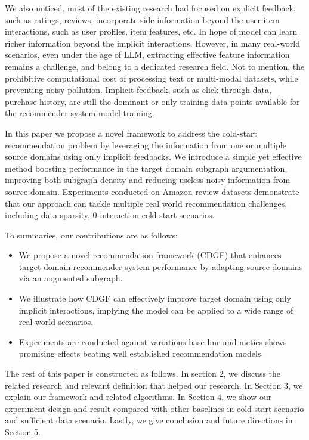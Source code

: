 We also noticed, most of the existing research had focused on explicit feedback, such as ratings, reviews, incorporate side information beyond the user-item interactions, such as user profiles, item features, etc. In hope of model can learn richer information beyond the implicit interactions.
However, in many real-world scenarios, even under the age of LLM, extracting effective feature information remains a challenge, and belong to a dedicated research field. Not to mention, the prohibitive computational cost of processing text or multi-modal datasets, while preventing noisy pollution. Implicit feedback, such as click-through data, purchase history, are still the dominant or only training data points available for the recommender system model training.

In this paper we propose a novel framework to address the cold-start recommendation problem by leveraging the information from one or multiple source domains using only implicit feedbacks. We introduce a simple yet effective method boosting performance in the target domain subgraph argumentation, improving both subgraph density and reducing useless noisy information from source domain. Experiments conducted on Amazon review datasets demonstrate that our approach can tackle multiple real world recommendation challenges, including data sparsity, 0-interaction cold start scenarios.

To summaries, our contributions are as follows:
\begin{itemize}
    \item We propose a novel recommendation framework (CDGF) that enhances target domain recommender system performance by adapting source domains via an augmented subgraph.
    \item We illustrate how CDGF can effectively improve target domain using only implicit interactions, implying the model can be applied to a wide range of real-world scenarios.
    \item Experiments are conducted against variations base line and metics shows promising effects beating well established recommendation models.
\end{itemize}

The rest of this paper is constructed as follows.
In section 2, we discuss the related research and relevant definition that helped our research.
In Section 3, we explain our framework and related algorithms.
In Section 4, we show our experiment design and result compared with other baselines in cold-start scenario and sufficient data scenario.
Lastly, we give conclusion and future directions in Section 5.

